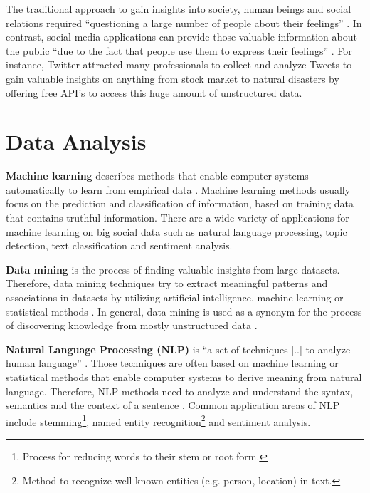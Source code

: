 The traditional approach to gain insights into society, human beings and social relations required \enquote{questioning a large number of people about their feelings} \cite[1]{flaounas2012big}. In contrast, social media applications can provide those valuable information about the public \enquote{due to the fact that people use them to express their feelings} \cite[1]{flaounas2012big}. For instance, Twitter attracted many professionals to collect and analyze Tweets to gain valuable insights on anything from stock market to natural disasters by offering free API’s to access this huge amount of unstructured data.

\section{Data Analysis}
\label{sec:data-analysis}

\textbf{Machine learning} describes methods that enable computer systems automatically to learn from empirical data \cite{Domingos:2012:FUT:2347736.2347755,McKinsey2011}. Machine learning methods usually focus on the prediction and classification of information, based on training data that contains truthful information. There are a wide variety of applications for machine learning on big social data such as natural language processing, topic detection, text classification and sentiment analysis.

\vspace{10 mm}
\textbf{Data mining} is the process of finding valuable insights from large datasets. Therefore, data mining techniques try to extract meaningful patterns and associations in datasets by utilizing artificial intelligence, machine learning or statistical methods \cite{han2012mining}. In general, data mining is used as a synonym for the process of discovering knowledge from mostly unstructured data \cite[6\psqq]{han2012mining}.

\vspace{10 mm}
\textbf{Natural Language Processing (NLP)} is \enquote{a set of techniques [..] to analyze human language} \cite[29]{McKinsey2011}. Those techniques are often based on machine learning or statistical methods that enable computer systems to derive meaning from natural language. Therefore, NLP methods need to analyze and understand the syntax, semantics and the context of a sentence \cite{Linckels:2011:ESU:1995306}. Common application areas of NLP include stemming\footnote{Process for reducing words to their stem or root form.}, named entity  recognition\footnote{Method to recognize well-known entities (e.g. person, location) in text.} and sentiment analysis.

